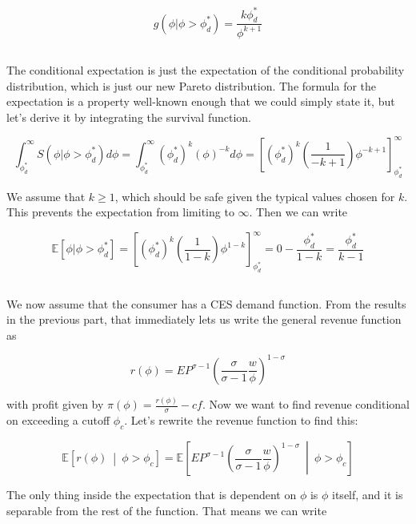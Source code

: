 \documentclass[12pt, letterpaper]{article}
\newcommand{\Ex}[1]{\mathbb{E}\left[#1\right]}
\begin{document}
    \[ g(\phi | \phi > \phi_d^*) = \frac{k \phi_d^*}{\phi^{k+1}} \]

    \subsection{}

    The conditional expectation is just the expectation of the conditional probability distribution, which is just our new Pareto distribution. The formula for the expectation is a property well-known enough that we could simply state it, but let's derive it by integrating the survival function.

    \[  \int_{\phi_d^*}^{\infty} S(\phi | \phi > \phi_d^*) d\phi = \int_{\phi_d^*}^{\infty} \left(\phi_d^*\right)^k\left(\phi\right)^{-k} d\phi = \left[ \left(\phi_d^*\right)^k \left(\frac{1}{-k+1}\right) \phi^{-k+1}   \right]_{\phi_d^*}^\infty    \]

    We assume that \(k \geq 1\), which should be safe given the typical values chosen for \(k\). This prevents the expectation from limiting to \(\infty\). Then we can write

    \[ \Ex{\phi | \phi > \phi_d^*} = \left[ \left(\phi_d^*\right)^k \left(\frac{1}{1 - k}\right) \phi^{1 - k}   \right]_{\phi_d^*}^\infty = 0 - \frac{\phi_d^*}{1 - k} = \frac{\phi_d^*}{k - 1}      \]

    \subsection{}

	We now assume that the consumer has a CES demand function. From the results in the previous part, that immediately lets us write the general revenue function as 

	\[ r(\phi) = EP^{\sigma - 1} \left( \frac{\sigma}{\sigma - 1} \frac{w}{\phi} \right)^{1 - \sigma}    \]

	with profit given by \(\pi(\phi) = \frac{r(\phi)}{\sigma} - cf\). Now we want to find revenue conditional on exceeding a cutoff \(\phi_c\). Let's rewrite the revenue function to find this:

	\[ \Ex{r(\phi)\ \middle|\ \phi > \phi_c} = \Ex{ EP^{\sigma - 1} \left( \frac{\sigma}{\sigma - 1} \frac{w}{\phi} \right)^{1 - \sigma}\ \middle|\ \phi > \phi_c }    \]

	The only thing inside the expectation that is dependent on \(\phi\) is \(\phi\) itself, and it is separable from the rest of the function. That means we can write
\end{document}
